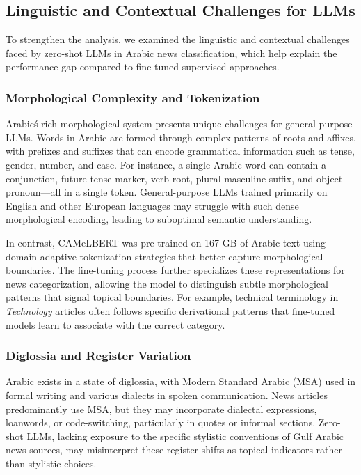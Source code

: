 \documentclass[sn-mathphys-num]{sn-jnl}
\begin{document}
\subsection{Linguistic and Contextual Challenges for LLMs}

To strengthen the analysis, we examined the linguistic and contextual challenges faced by zero-shot LLMs in Arabic news classification, which help explain the performance gap compared to fine-tuned supervised approaches.

\subsubsection{Morphological Complexity and Tokenization}

Arabic\'s rich morphological system presents unique challenges for general-purpose LLMs. Words in Arabic are formed through complex patterns of roots and affixes, with prefixes and suffixes that can encode grammatical information such as tense, gender, number, and case. For instance, a single Arabic word can contain a conjunction, future tense marker, verb root, plural masculine suffix, and object pronoun---all in a single token. General-purpose LLMs trained primarily on English and other European languages may struggle with such dense morphological encoding, leading to suboptimal semantic understanding.

In contrast, CAMeLBERT was pre-trained on 167 GB of Arabic text using domain-adaptive tokenization strategies that better capture morphological boundaries. The fine-tuning process further specializes these representations for news categorization, allowing the model to distinguish subtle morphological patterns that signal topical boundaries. For example, technical terminology in \textit{Technology} articles often follows specific derivational patterns that fine-tuned models learn to associate with the correct category.

\subsubsection{Diglossia and Register Variation}

Arabic exists in a state of diglossia, with Modern Standard Arabic (MSA) used in formal writing and various dialects in spoken communication. News articles predominantly use MSA, but they may incorporate dialectal expressions, loanwords, or code-switching, particularly in quotes or informal sections. Zero-shot LLMs, lacking exposure to the specific stylistic conventions of Gulf Arabic news sources, may misinterpret these register shifts as topical indicators rather than stylistic choices.
\end{document}
